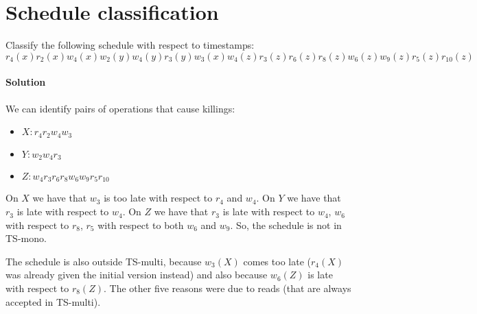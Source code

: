 \section{Schedule classification}

Classify the following schedule with respect to timestamps: 
\[r_4(x) r_2(x) w_4(x) w_2(y) w_4(y) r_3(y) w_3(x) w_4(z) r_3(z) r_6(z) r_8(z) w_6(z) w_9(z) r_5(z) r_{10}(z)\]

\paragraph*{Solution}
We can identify pairs of operations that cause killings:
\begin{itemize}
    \item $X: r_4 r_2 w_4 w_3$
    \item $Y: w_2 w_4 r_3$
    \item $Z: w_4 r_3 r_6 r_8 w_6 w_9 r_5 r_{10}$
\end{itemize}
On $X$ we have that $w_3$ is too late with respect to $r_4$ and $w_4$. On $Y$ we have that $r_3$ is late with respect to $w_4$. On 
$Z$ we have that $r_3$ is late with respect to $w_4$, $w_6$ with respect to $r_8$, $r_5$ with respect to both $w_6$ and $w_9$. 
So, the schedule is not in TS-mono. 

The schedule is also outside TS-multi, because $w_3(X)$ comes too late ($r_4(X)$ was already given the initial version instead) and 
also because $w_6(Z)$ is late with respect to $r_8(Z)$. The other five reasons were due to reads (that are always accepted in TS-multi).